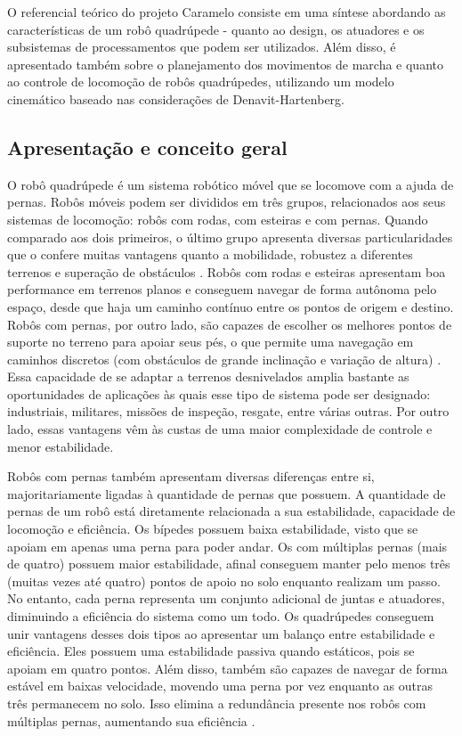 \documentclass[../main.tex]{subfiles}
\begin{document}
 
  O referencial teórico do projeto Caramelo consiste em uma síntese abordando as características de um robô quadrúpede - quanto ao design, os atuadores e os subsistemas de processamentos que podem ser utilizados. Além disso, é apresentado também sobre o planejamento dos movimentos de marcha e quanto ao controle de locomoção de robôs quadrúpedes, utilizando um modelo cinemático baseado nas considerações de Denavit-Hartenberg.

  \subsection{Apresentação e conceito geral}
  O robô quadrúpede é um sistema robótico móvel que se locomove com a ajuda de pernas. Robôs móveis podem ser divididos em três grupos, relacionados aos seus sistemas de locomoção: robôs com rodas, com esteiras e com pernas. Quando comparado aos dois primeiros, o último grupo apresenta diversas particularidades que o confere muitas vantagens quanto a mobilidade, robustez a diferentes terrenos e superação de obstáculos \cite{Biswal2021}. Robôs com rodas e esteiras apresentam boa performance em terrenos planos e conseguem navegar de forma autônoma pelo espaço, desde que haja um caminho contínuo entre os pontos de origem e destino. Robôs com pernas, por outro lado, são capazes de escolher os melhores pontos de suporte no terreno para apoiar seus pés, o que permite uma navegação em caminhos discretos (com obstáculos de grande inclinação e variação de altura) \cite{Yao2021}. Essa capacidade de se adaptar a terrenos desnivelados amplia bastante as oportunidades de aplicações às quais esse tipo de sistema pode ser designado: industriais, militares, missões de inspeção, resgate, entre várias outras. Por outro lado, essas vantagens vêm às custas de uma maior complexidade de controle e menor estabilidade.

  Robôs com pernas também apresentam diversas diferenças entre si, majoritariamente ligadas à quantidade de pernas que possuem. A quantidade de pernas de um robô está diretamente relacionada a sua estabilidade, capacidade de locomoção e eficiência. Os bípedes possuem baixa estabilidade, visto que se apoiam em apenas uma perna para poder andar. Os com múltiplas pernas (mais de quatro) possuem maior estabilidade, afinal conseguem manter pelo menos três (muitas vezes até quatro) pontos de apoio no solo enquanto realizam um passo. No entanto, cada perna representa um conjunto adicional de juntas e atuadores, diminuindo a eficiência do sistema como um todo. Os quadrúpedes conseguem unir vantagens desses dois tipos ao apresentar um balanço entre estabilidade e eficiência. Eles possuem uma estabilidade passiva quando estáticos, pois se apoiam em quatro pontos. Além disso, também são capazes de navegar de forma estável em baixas velocidade, movendo uma perna por vez enquanto as outras três permanecem no solo. Isso elimina a redundância presente nos robôs com múltiplas pernas, aumentando sua eficiência \cite{Yao2021}.
\end{document}
